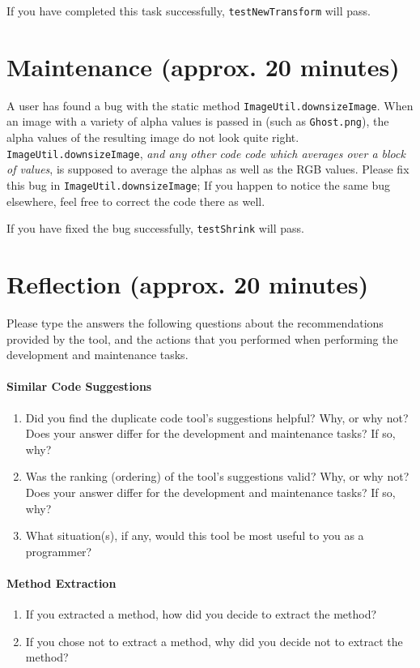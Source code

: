 \documentclass[12pt]{article}
\begin{document}
If you have completed this task successfully, \verb|testNewTransform| will pass.

\section{Maintenance (approx. 20 minutes)}

A user has found a bug with the static method
\verb|ImageUtil.downsizeImage|.  When an image with a variety of alpha
values is passed in (such as  \verb|Ghost.png|), the alpha values of the resulting image do not
look quite right.  \verb|ImageUtil.downsizeImage|, \textit{and any
  other code code which averages over a block of values}, is supposed
to average the alphas as well as the RGB values.  Please fix this bug
in \verb|ImageUtil.downsizeImage|; If you happen to notice the same
bug elsewhere, feel free to correct the code there as well.

If you have fixed the bug successfully, \verb|testShrink| will pass.

\section{Reflection (approx. 20 minutes)}

Please type the answers the following questions about the
recommendations provided by the tool, and the actions that you
performed when performing the development and maintenance tasks.

\paragraph{Similar Code Suggestions}

\begin{enumerate}
  \item Did you find the duplicate code tool's suggestions helpful?
    Why, or why not? Does your answer differ for the development and
    maintenance tasks? If so, why?
  \item Was the ranking (ordering) of the tool's suggestions valid?
    Why, or why not? Does your answer differ for the development and
    maintenance tasks? If so, why?
  \item What situation(s), if any, would this tool be most useful to you as a 		    programmer?
\end{enumerate}

\paragraph{Method Extraction}

\begin{enumerate}
  \item If you extracted a method, how did you decide to extract the
    method? 
  \item If you chose not to extract a method, why did you decide not
    to extract the method?
\end{enumerate}
\end{document}
